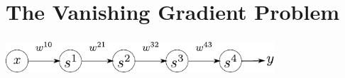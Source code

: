\section{The Vanishing Gradient Problem}


\begin{frame}\frametitle{\secname}
	\begin{center}
		\includegraphics[width=10cm]{img/simple_arch}
	\end{center}
\end{frame}



